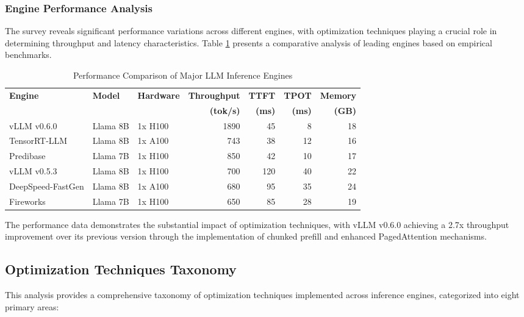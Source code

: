 \documentclass[12pt,a4paper]{article}
\begin{document}
\subsubsection{Engine Performance Analysis}

The survey reveals significant performance variations across different engines, with optimization techniques playing a crucial role in determining throughput and latency characteristics. Table \ref{tab:performance_comparison} presents a comparative analysis of leading engines based on empirical benchmarks.

\begin{table}[htbp]
\centering
\caption{Performance Comparison of Major LLM Inference Engines}
\label{tab:performance_comparison}
\begin{tabular}{@{}lllrrrr@{}}
\toprule
\textbf{Engine} & \textbf{Model} & \textbf{Hardware} & \textbf{Throughput} & \textbf{TTFT} & \textbf{TPOT} & \textbf{Memory} \\
& & & \textbf{(tok/s)} & \textbf{(ms)} & \textbf{(ms)} & \textbf{(GB)} \\
\midrule
vLLM v0.6.0 & Llama 8B & 1x H100 & 1890 & 45 & 8 & 18 \\
TensorRT-LLM & Llama 8B & 1x A100 & 743 & 38 & 12 & 16 \\
Predibase & Llama 7B & 1x H100 & 850 & 42 & 10 & 17 \\
vLLM v0.5.3 & Llama 8B & 1x H100 & 700 & 120 & 40 & 22 \\
DeepSpeed-FastGen & Llama 8B & 1x A100 & 680 & 95 & 35 & 24 \\
Fireworks & Llama 7B & 1x H100 & 650 & 85 & 28 & 19 \\
\bottomrule
\end{tabular}
\end{table}

The performance data demonstrates the substantial impact of optimization techniques, with vLLM v0.6.0 achieving a 2.7x throughput improvement over its previous version through the implementation of chunked prefill and enhanced PagedAttention mechanisms.

\subsection{Optimization Techniques Taxonomy}

This analysis provides a comprehensive taxonomy of optimization techniques implemented across inference engines, categorized into eight primary areas:
\end{document}
